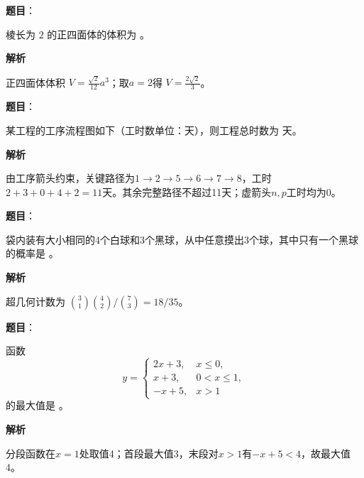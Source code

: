 \begin{answer}

\textbf{题目}：

棱长为 $2$ 的正四面体的体积为 \gkblank{}。

\textbf{解析}

正四面体体积 $V=\frac{\sqrt2}{12}a^3$；取$a=2$得 $V=\frac{2\sqrt2}{3}$。


\end{answer}
\begin{answer}

\textbf{题目}：

某工程的工序流程图如下（工时数单位：天），则工程总时数为 \gkblank{} 天。
\nopagebreak[4]
\begin{center}\end{center}
\nopagebreak[4]
\textbf{解析}

由工序箭头约束，关键路径为$1\to2\to5\to6\to7\to8$，工时$2+3+0+4+2=11$天。其余完整路径不超过11天；虚箭头$n,p$工时均为0。


\end{answer}
\begin{answer}

\textbf{题目}：

袋内装有大小相同的4个白球和3个黑球，从中任意摸出3个球，其中只有一个黑球的概率是 \gkblank{}。

\textbf{解析}

超几何计数为 $\binom31\binom42/\binom73=18/35$。


\end{answer}
\begin{answer}

\textbf{题目}：

函数
\nopagebreak[4]
\[
y=\begin{cases}
2x+3,&x\le 0,\\
x+3,&0<x\le1,\\
-x+5,&x>1
\end{cases}
\]
的最大值是 \gkblank{}。

\textbf{解析}

分段函数在$x=1$处取值4；首段最大值3，末段对$x>1$有$-x+5<4$，故最大值4。


\end{answer}
